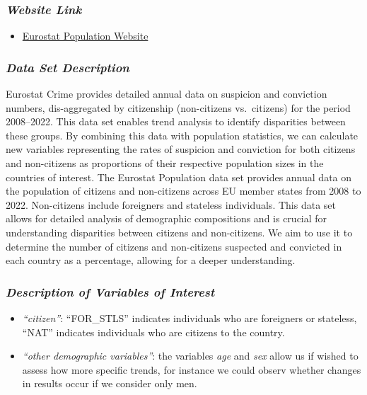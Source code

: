 \documentclass[
]{article}
\providecommand{\tightlist}{%
  \setlength{\itemsep}{0pt}\setlength{\parskip}{0pt}}\usepackage{longtable,booktabs,array}
\begin{document}
\subsubsection{\texorpdfstring{\emph{Website
Link}}{Website Link}}\label{website-link-1}

\begin{itemize}
\tightlist
\item
  \href{https://ec.europa.eu/eurostat/api/dissemination/sdmx/2.1/data/migr_pop2ctz?format=TSV&compressed=true}{Eurostat
  Population Website}
\end{itemize}

\subsubsection{\texorpdfstring{\emph{Data Set
Description}}{Data Set Description}}\label{data-set-description-1}

Eurostat Crime provides detailed annual data on suspicion and conviction
numbers, dis-aggregated by citizenship (non-citizens vs.~citizens) for
the period 2008--2022. This data set enables trend analysis to identify
disparities between these groups. By combining this data with population
statistics, we can calculate new variables representing the rates of
suspicion and conviction for both citizens and non-citizens as
proportions of their respective population sizes in the countries of
interest. The Eurostat Population data set provides annual data on the
population of citizens and non-citizens across EU member states from
2008 to 2022. Non-citizens include foreigners and stateless individuals.
This data set allows for detailed analysis of demographic compositions
and is crucial for understanding disparities between citizens and
non-citizens. We aim to use it to determine the number of citizens and
non-citizens suspected and convicted in each country as a percentage,
allowing for a deeper understanding.

\subsubsection{\texorpdfstring{\emph{Description of Variables of
Interest}}{Description of Variables of Interest}}\label{description-of-variables-of-interest-1}

\begin{itemize}
\tightlist
\item
  \emph{``citizen''}: ``FOR\_STLS'' indicates individuals who are
  foreigners or stateless, ``NAT'' indicates individuals who are
  citizens to the country.
\item
  \emph{``other demographic variables''}: the variables \emph{age} and
  \emph{sex} allow us if wished to assess how more specific trends, for
  instance we could observ whether changes in results occur if we
  consider only men.
\end{itemize}
\end{document}

